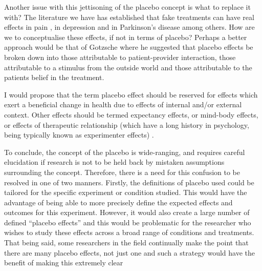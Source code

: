 Another issue with this jettisoning of the placebo concept is what to replace it with? The literature we have has established that fake treatments can have real effects \cite{Meissner2007}  in pain \cite{Vase2002} , in depression \cite{Kirsch2002a}  and in Parkinson's disease \cite{Benedetti2004a} among others. How are we to conceptualise these effects, if not in terms of placebo? Perhaps a better approach would be that of Gotzsche \cite{Gotzsche1995} where he suggested that placebo effects be broken down into those attributable to patient-provider interaction, those attributable to a stimulus from the outside world and those attributable to the patients belief in the treatment. 



I would propose that the term placebo effect should be reserved for effects which exert a beneficial change in health due to effects of internal and/or external context. Other effects should be termed expectancy effects, or mind-body effects, or effects of therapeutic relationship (which have a long history in psychology, being typically known as experimenter effects) \cite{rosenthal1969interpersonal,rosenthal1967covert,Rosenthal1956}.  


To conclude, the concept of the placebo is wide-ranging, and requires careful elucidation if research is not to be held back by mistaken assumptions surrounding the concept. Therefore, there is a need for this confusion to be resolved in one of two manners. Firstly, the definitions of placebo used could be tailored for the specific experiment or condition studied. This would have the advantage of being able to more precisely define the expected effects and outcomes for this experiment. However, it would also create a large number of defined ``placebo effects'' and this would be problematic for the researcher who wishes to study these effects across a broad range of conditions and treatments. That being said, some researchers in the field continually make the point that there are many placebo effects, not just one and such a strategy would have the benefit of making this extremely clear \cite{Benedetti2008} 

